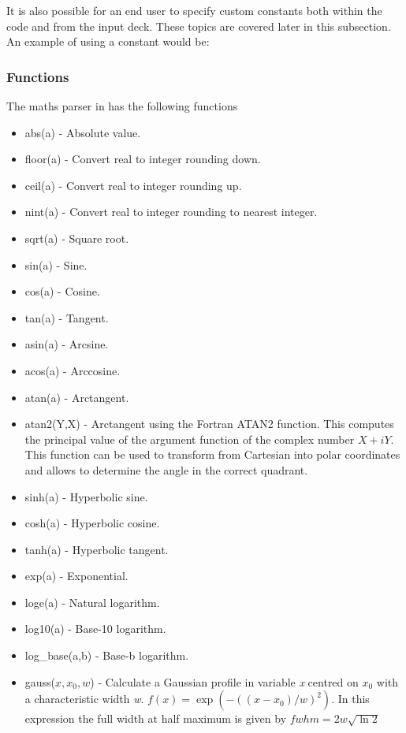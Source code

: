 It is also possible for an end user to specify custom constants both within
the code and from the input deck. These topics are covered later in this
subsection. An example of using a constant would be:\\
\indent{}

\subsubsection{Functions}
\label{sec:functions}
The maths parser in {\EPOCH} has the following functions
\begin{itemize}
\item abs(a) - Absolute value.
\item floor(a) - Convert real to integer rounding down.
\item ceil(a) - Convert real to integer rounding up.
\item nint(a) - Convert real to integer rounding to nearest integer.
\item sqrt(a) - Square root.
\item sin(a) - Sine.
\item cos(a) - Cosine.
\item tan(a) - Tangent.
\item asin(a) - Arcsine.
\item acos(a) - Arccosine.
\item atan(a) - Arctangent.
\item atan2(Y,X) - Arctangent using the Fortran ATAN2 function. This computes
    the principal value of the argument function of the complex number
    $X + i Y$. This function can be used to transform from Cartesian into polar
    coordinates and allows to determine the angle in the correct quadrant.
\item sinh(a) - Hyperbolic sine.
\item cosh(a) - Hyperbolic cosine.
\item tanh(a) - Hyperbolic tangent.
\item exp(a) - Exponential.
\item loge(a) - Natural logarithm.
\item log10(a) - Base-10 logarithm.
\item log\_base(a,b) - Base-b logarithm.
\item gauss($x,x_0,w$) - Calculate a Gaussian profile in variable
    {\it x} centred on {\it $x_0$} with a characteristic width {\it w}.
    $f(x) = \exp{(-((x-x_0)/w)^2)}$. In this expression the
    full width at half maximum is given by $fwhm = 2 w \sqrt{\ln{2}}$

\end{itemize}
